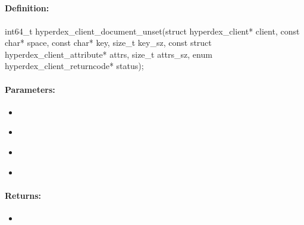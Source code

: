 \pagebreak
\subsection{}
\label{api:c:document_unset}


\paragraph{Definition:}
\begin{ccode}
int64_t hyperdex_client_document_unset(struct hyperdex_client* client,
        const char* space,
        const char* key, size_t key_sz,
        const struct hyperdex_client_attribute* attrs, size_t attrs_sz,
        enum hyperdex_client_returncode* status);
\end{ccode}

\paragraph{Parameters:}
\begin{itemize}[noitemsep]
\item {}\\

\item {}\\

\item {}\\

\item {}\\

\end{itemize}

\paragraph{Returns:}
\begin{itemize}[noitemsep]
\item {}\\

\end{itemize}


